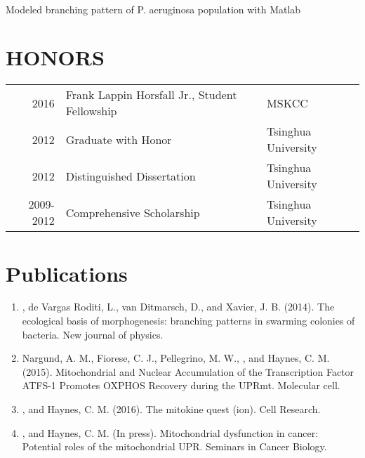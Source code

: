 \documentclass[]{deedy-resume-openfont}
\begin{document}
\begin{minipage}[t]{0.66\textwidth}
 \\
\begin{tightemize}
\item 
Modeled branching pattern of P. aeruginosa population with Matlab \\
 { }

\end{tightemize}
\sectionsep



\section{HONORS} 
\begin{tabular}{rll}
2016 &Frank Lappin Horsfall Jr., Student Fellowship 
&MSKCC	\\
2012 &Graduate with Honor &Tsinghua University \\
2012 &Distinguished Dissertation &Tsinghua University \\
2009-2012 & Comprehensive Scholarship &Tsinghua University \\

\end{tabular}
\sectionsep


\section{Publications} 
\begin{enumerate}[topsep=0pt,itemsep=-1ex,partopsep=1ex,parsep=1ex]
\item {}, de Vargas Roditi, L., van Ditmarsch, D., and Xavier, J. B. (2014). The ecological basis of morphogenesis: branching patterns in swarming colonies of bacteria. New journal of physics. \\
\item  Nargund, A. M., Fiorese, C. J., Pellegrino, M. W., , and Haynes, C. M. (2015). Mitochondrial and Nuclear Accumulation of the Transcription Factor ATFS-1 Promotes OXPHOS Recovery during the UPRmt. Molecular cell. \\
\item  {}, and Haynes, C. M. (2016). The mitokine quest (ion). Cell Research. \\
\item  {}, and Haynes, C. M. (In press). Mitochondrial dysfunction in cancer: Potential roles of the mitochondrial UPR. Seminars in Cancer Biology.
\end{enumerate}
\sectionsep

\end{minipage} 
\end{document}
